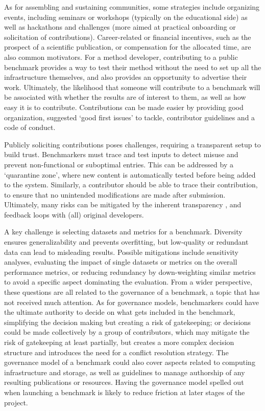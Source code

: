 \documentclass[11pt]{article}
\begin{document}
As for assembling and sustaining communities, some strategies include organizing events, including seminars or workshops (typically on the educational side) as well as hackathons and challenges (more aimed at practical onboarding or solicitation of contributions). Career-related or financial incentives, such as the prospect of a scientific publication, or compensation for the allocated time, are also common motivators. For a method developer, contributing to a public benchmark provides a way to test their method without the need to set up all the infrastructure themselves, and also provides an opportunity to advertise their work. Ultimately, the likelihood that someone will contribute to a benchmark will be associated with whether the results are of interest to them, as well as how easy it is to contribute. Contributions can be made easier by providing good organization, suggested `good first issues' to tackle, contributor guidelines and a code of conduct.

Publicly soliciting contributions poses challenges, requiring a transparent setup to build trust. Benchmarkers must trace and test inputs to detect misuse and prevent non-functional or suboptimal entries. This can be addressed by a `quarantine zone', where new content is automatically tested before being added to the system. Similarly, a contributor should be able to trace their contribution, to ensure that no unintended modifications are made after submission. Ultimately, many risks can be mitigated by the inherent transparency \cite{Greenstein2016-os}, and feedback loops with (all) original developers.

A key challenge is selecting datasets and metrics for a benchmark. Diversity ensures generalizability and prevents overfitting, but low-quality or redundant data can lead to misleading results. Possible mitigations include sensitivity analyses, evaluating the impact of single datasets or metrics on the overall performance metrics, or reducing redundancy by down-weighting similar metrics to avoid a specific aspect dominating the evaluation. From a wider perspective, these questions are all related to the governance of a benchmark, a topic that has not received much attention. As for governance models, benchmarkers could have the ultimate authority to decide on what gets included in the benchmark, simplifying the decision making but creating a risk of gatekeeping; or decisions could be made collectively by a group of contributors, which may mitigate the risk of gatekeeping at least partially, but creates a more complex decision structure and introduces the need for a conflict resolution strategy. The governance model of a benchmark could also cover aspects related to computing infrastructure and storage, as well as guidelines to manage authorship of any resulting publications or resources. Having the governance model spelled out when launching a benchmark is likely to reduce friction at later stages of the project.
\end{document}
